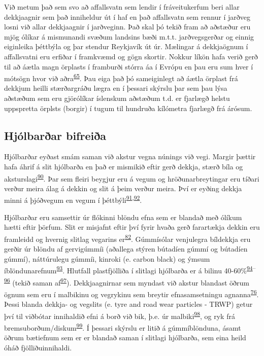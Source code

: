 \documentclass[icelandic,]{book}
\begin{document}
Við metum það sem svo að affallsvatn sem lendir í fráveitukerfum beri allar dekkjaagnir sem það inniheldur út í haf en það affallsvatn sem rennur í jarðveg losni við allar dekkjaagnir í jarðveginn. Það skal þó tekið fram að aðstæður eru mjög ólíkar á mismunandi svæðum landsins bæði m.t.t. jarðvegsgerðar og einnig eiginleika þéttbýla og þar stendur Reykjavík út úr. Mælingar á dekkjaögnum í affallsvatni eru erfiðar í framkvæmd og gögn skortir. Nokkur líkön hafa verið gerð til að áætla magn örplasts í framburði stórra áa í Evrópu en þau eru sum hver í mótsögn hvor við aðra\textsuperscript{\protect\hyperlink{ref-unice2019characterizing1}{65}}. Þau eiga það þó sameiginlegt að áætla örplast frá dekkjum heilli stærðargráðu lægra en í þessari skýrslu þar sem þau lýsa aðstæðum sem eru gjörólíkar íslenskum aðstæðum t.d. er fjarlægð helstu uppspretta örplsts (borgir) í tugum til hundruða kílómetra fjarlægð frá árósum.

\hypertarget{hjolbarar-bifreia}{%
\subsection*{Hjólbarðar bifreiða}\label{hjolbarar-bifreia}}

Hjólbarðar eyðast smám saman við akstur vegna núnings við vegi. Margir þættir hafa áhrif á slit hjólbarða en það er mismikið eftir gerð dekkja, stærð bíla og aksturslagi\textsuperscript{\protect\hyperlink{ref-panko2018review}{90}}. Þar sem fleiri beygjur eru á vegum og hröðunarbreytingar eru tíðari verður meira álag á dekkin og slit á þeim verður meira. Því er eyðing dekkja minni á þjóðvegum en vegum í þéttbýli\textsuperscript{\protect\hyperlink{ref-luhana2004measurement}{91},\protect\hyperlink{ref-Kwak2013}{92}}.

Hjólbarðar eru samsettir úr flókinni blöndu efna sem er blandað með ólíkum hætti eftir þörfum. Slit er misjafnt eftir því fyrir hvaða gerð farartækja dekkin eru framleidd og hvernig slitlag vegarins er\textsuperscript{\protect\hyperlink{ref-grigoratos2014non}{82}}. Gúmmísólar venjulegra bíldekkja eru gerðir úr blöndu af gervigúmmíi (aðallega stýren bútadíen gúmmí og bútadíen gúmmí), náttúrulegu gúmmíi, kinroki (e. carbon black) og ýmsum íblöndunarefnum\textsuperscript{\protect\hyperlink{ref-Evans2006}{93}}. Hlutfall plastfjölliða í slitlagi hjólbarða er á bilinu 40-60\%\textsuperscript{\protect\hyperlink{ref-Redondo-hasselerharm2018}{94}--\protect\hyperlink{ref-barbin1994science}{96}} (tekið saman af\textsuperscript{\protect\hyperlink{ref-Wik2009}{97}}). Dekkjaagnirnar sem myndast við akstur blandast öðrum ögnum sem eru í malbikinu og vegrykinu sem breytir efnasamsetningu agnanna\textsuperscript{\protect\hyperlink{ref-kreider2010physical}{76}}. Þessi blanda dekkja- og vegslits (e. tyre and road wear particles - TRWP) getur því til viðbótar innihaldið efni á borð við bik, þ.e. úr malbiki\textsuperscript{\protect\hyperlink{ref-fauser2002tire}{98}}, og ryk frá bremsuborðum/diskum\textsuperscript{\protect\hyperlink{ref-kwak2013characterization}{99}}. Í þessari skýrslu er litið á gúmmíblönduna, ásamt öðrum bætiefnum sem er er blandað saman í slitlagi hjólbarða, sem eina heild óháð fjölliðuinnihaldi.
\end{document}
